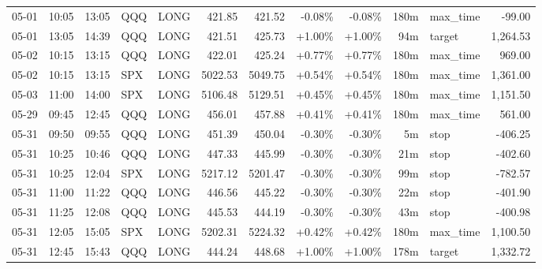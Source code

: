 \documentclass[11pt,a4paper]{article}
\begin{document}
\begin{center}
\begin{longtable}{>{\color{txtmain}}l l l l l r r r r r >{\color{txtmain}}l r}
05-01 & 10:05 & 13:05 & QQQ & LONG & 421.85 & 421.52 & \textcolor{lossred}{-0.08\%} & \textcolor{lossred}{-0.08\%} & 180m & max\_time & \textcolor{lossred}{-99.00} \\
05-01 & 13:05 & 14:39 & QQQ & LONG & 421.51 & 425.73 & \textcolor{wingreen}{+1.00\%} & \textcolor{wingreen}{+1.00\%} & 94m & target & \textcolor{wingreen}{1,264.53} \\
05-02 & 10:15 & 13:15 & QQQ & LONG & 422.01 & 425.24 & \textcolor{wingreen}{+0.77\%} & \textcolor{wingreen}{+0.77\%} & 180m & max\_time & \textcolor{wingreen}{969.00} \\
05-02 & 10:15 & 13:15 & SPX & LONG & 5022.53 & 5049.75 & \textcolor{wingreen}{+0.54\%} & \textcolor{wingreen}{+0.54\%} & 180m & max\_time & \textcolor{wingreen}{1,361.00} \\
05-03 & 11:00 & 14:00 & SPX & LONG & 5106.48 & 5129.51 & \textcolor{wingreen}{+0.45\%} & \textcolor{wingreen}{+0.45\%} & 180m & max\_time & \textcolor{wingreen}{1,151.50} \\
05-29 & 09:45 & 12:45 & QQQ & LONG & 456.01 & 457.88 & \textcolor{wingreen}{+0.41\%} & \textcolor{wingreen}{+0.41\%} & 180m & max\_time & \textcolor{wingreen}{561.00} \\
05-31 & 09:50 & 09:55 & QQQ & LONG & 451.39 & 450.04 & \textcolor{lossred}{-0.30\%} & \textcolor{lossred}{-0.30\%} & 5m & stop & \textcolor{lossred}{-406.25} \\
05-31 & 10:25 & 10:46 & QQQ & LONG & 447.33 & 445.99 & \textcolor{lossred}{-0.30\%} & \textcolor{lossred}{-0.30\%} & 21m & stop & \textcolor{lossred}{-402.60} \\
05-31 & 10:25 & 12:04 & SPX & LONG & 5217.12 & 5201.47 & \textcolor{lossred}{-0.30\%} & \textcolor{lossred}{-0.30\%} & 99m & stop & \textcolor{lossred}{-782.57} \\
05-31 & 11:00 & 11:22 & QQQ & LONG & 446.56 & 445.22 & \textcolor{lossred}{-0.30\%} & \textcolor{lossred}{-0.30\%} & 22m & stop & \textcolor{lossred}{-401.90} \\
05-31 & 11:25 & 12:08 & QQQ & LONG & 445.53 & 444.19 & \textcolor{lossred}{-0.30\%} & \textcolor{lossred}{-0.30\%} & 43m & stop & \textcolor{lossred}{-400.98} \\
05-31 & 12:05 & 15:05 & SPX & LONG & 5202.31 & 5224.32 & \textcolor{wingreen}{+0.42\%} & \textcolor{wingreen}{+0.42\%} & 180m & max\_time & \textcolor{wingreen}{1,100.50} \\
05-31 & 12:45 & 15:43 & QQQ & LONG & 444.24 & 448.68 & \textcolor{wingreen}{+1.00\%} & \textcolor{wingreen}{+1.00\%} & 178m & target & \textcolor{wingreen}{1,332.72} \\

\end{longtable}
\end{center}
\end{document}
